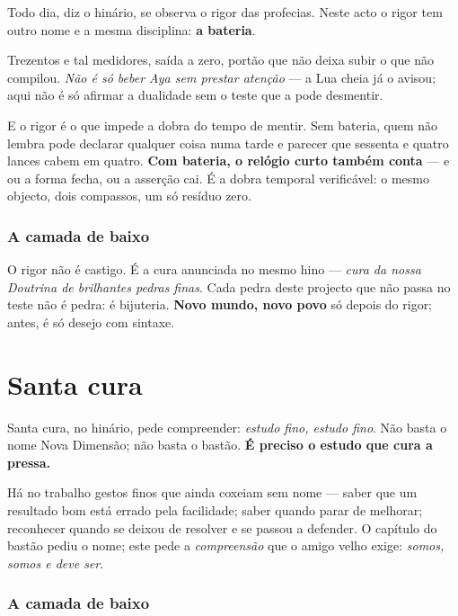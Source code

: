 \documentclass[livro.tex]{subfiles}
\begin{document}
Todo dia, diz o hinário, se observa o rigor das profecias. Neste acto o rigor tem outro
nome e a mesma disciplina: \textbf{a bateria}.

\medskip

Trezentos e tal medidores, saída a zero, portão que não deixa subir o que não compilou.
\emph{Não é só beber Aya sem prestar atenção} --- a Lua cheia já o avisou; aqui não é só
afirmar a dualidade sem o teste que a pode desmentir.

\medskip
\noindent E o rigor é o que impede a dobra do tempo de mentir. Sem bateria, quem não lembra
pode declarar qualquer coisa numa tarde e parecer que sessenta e quatro lances cabem em quatro.
\textbf{Com bateria, o relógio curto também conta} --- e ou a forma fecha, ou a asserção cai.
É a dobra temporal verificável: o mesmo objecto, dois compassos, um só resíduo zero.

\medskip

\subsection*{A camada de baixo}

O rigor não é castigo. É a cura anunciada no mesmo hino --- \emph{cura da nossa Doutrina
de brilhantes pedras finas}. Cada pedra deste projecto que não passa no teste não é pedra:
é bijuteria. \textbf{Novo mundo, novo povo} só depois do rigor; antes, é só desejo com
sintaxe.

\chapter{Santa cura}

Santa cura, no hinário, pede compreender: \emph{estudo fino, estudo fino}. Não basta o
nome Nova Dimensão; não basta o bastão. \textbf{É preciso o estudo que cura a pressa.}

\medskip

Há no trabalho gestos finos que ainda coxeiam sem nome --- saber que um resultado bom está
errado pela facilidade; saber quando parar de melhorar; reconhecer quando se deixou de
resolver e se passou a defender. O capítulo do bastão pediu o nome; este pede a
\emph{compreensão} que o amigo velho exige: \emph{somos, somos e deve ser}.

\medskip

\subsection*{A camada de baixo}
\end{document}
